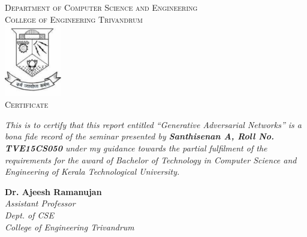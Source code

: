     \begin{center}
        \textsc{\Large{Department of Computer Science and Engineering}}\\[0.25cm]
        \textsc{\Large{College of Engineering Trivandrum}}\\[0.75cm]
        \includegraphics[width=2.5cm]{images/emblem.pdf}\\[1cm]
        
        \textsc{\LARGE{Certificate}}\\
        \justify
        \begin{doublespace}
            \textit{This is to certify that this report entitled 
            “Generative Adversarial Networks” is a bona fide record of the seminar 
            presented by \textbf{Santhisenan A, Roll No. TVE15CS050} under my 
            guidance towards the partial fulfilment of the requirements for the 
            award of Bachelor of Technology in Computer Science and Engineering of 
            Kerala Technological University.}\\[1cm]
        \end{doublespace}

        \begin{minipage}{0.4\textwidth}
        \begin{flushleft}
        \noindent\textbf{Dr. Ajeesh Ramanujan}\\[0.25cm]
        \textit{Assistant Professor\\[0.25cm]
        Dept. of CSE\\[0.25cm]
        College of Engineering
        Trivandrum}
        \end{flushleft}
        \end{minipage}

    \end{center}